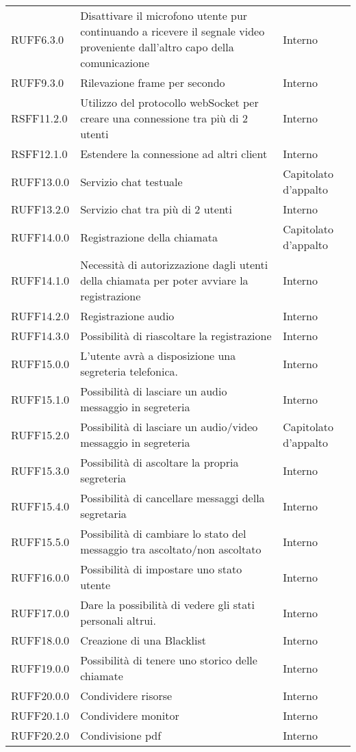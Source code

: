 \begin{longtable}{lp{}l}
RUFF6.3.0 & Disattivare il microfono utente pur continuando a ricevere il segnale video proveniente dall'altro capo della comunicazione & Interno \\
RUFF9.3.0 & Rilevazione frame per secondo & Interno \\
RSFF11.2.0 & Utilizzo del protocollo webSocket per creare una connessione tra più di 2 utenti & Interno \\
RSFF12.1.0 & Estendere la connessione ad altri client & Interno \\
RUFF13.0.0 & Servizio chat testuale & Capitolato d'appalto \\
RUFF13.2.0 & Servizio chat tra più di 2 utenti & Interno \\
RUFF14.0.0 & Registrazione della chiamata & Capitolato d'appalto \\
RUFF14.1.0 & Necessità di autorizzazione dagli utenti della chiamata per poter avviare la registrazione & Interno \\
RUFF14.2.0 & Registrazione audio & Interno \\
RUFF14.3.0 & Possibilità di riascoltare la registrazione & Interno \\
RUFF15.0.0 & L'utente avrà a disposizione una segreteria telefonica. & Interno \\
RUFF15.1.0 & Possibilità di lasciare un audio messaggio in segreteria & Interno \\
RUFF15.2.0 & Possibilità di lasciare un audio/video messaggio in segreteria & Capitolato d'appalto \\
RUFF15.3.0 & Possibilità di ascoltare la propria segreteria & Interno \\
RUFF15.4.0 & Possibilità di cancellare messaggi della segretaria & Interno \\
RUFF15.5.0 & Possibilità di cambiare lo stato del messaggio tra ascoltato/non ascoltato & Interno \\
RUFF16.0.0 & Possibilità di impostare uno stato utente & Interno \\
RUFF17.0.0 & Dare la possibilità di vedere gli stati personali altrui. & Interno \\
RUFF18.0.0 & Creazione di una Blacklist & Interno \\
RUFF19.0.0 & Possibilità di tenere uno storico delle chiamate & Interno \\
RUFF20.0.0 & Condividere risorse & Interno \\
RUFF20.1.0 & Condividere monitor & Interno \\
RUFF20.2.0 & Condivisione pdf & Interno \\

\end{longtable}
